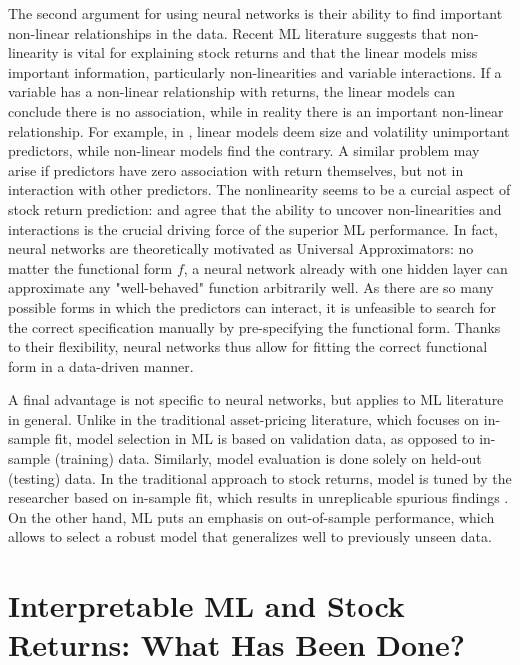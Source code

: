 		 	The second argument for using neural networks is their ability to find important non-linear relationships in the data. Recent ML literature suggests that non-linearity is vital for explaining stock returns \citep{gu2020empirical, bryzgalova2019forest} and that the linear models miss important information, particularly non-linearities and variable interactions. If a variable has a non-linear relationship with returns, the linear models can conclude there is no association, while in reality there is an important non-linear relationship. For example, in \cite{gu2020empirical}, linear models deem size and volatility unimportant predictors, while non-linear models find the contrary. A similar problem may arise if predictors have zero association with return themselves, but not in interaction with other predictors. The nonlinearity seems to be a curcial aspect of stock return prediction: \cite{bryzgalova2019forest} and \cite{gu2020empirical} agree that the ability to uncover non-linearities and interactions is the crucial driving force of the superior ML performance.  	
		 	In fact, neural networks are theoretically motivated as Universal Approximators: no matter the functional form $f$, a neural network already with one hidden layer can approximate any "well-behaved" function arbitrarily well. As there are so many possible forms in which the predictors can interact, it is unfeasible to search for the correct specification manually by pre-specifying the functional form. Thanks to their flexibility, neural networks thus allow for fitting the correct functional form in a data-driven manner.
		 	
		 	A final advantage is not specific to neural networks, but applies to ML literature in general. Unlike in the traditional asset-pricing literature, which focuses on in-sample fit, model selection in ML is based on validation data, as opposed to in-sample (training) data. Similarly, model evaluation is done solely on held-out (testing) data. In the traditional approach to stock returns, model is tuned by the researcher based on in-sample fit, which results in unreplicable spurious findings \citep{mclean2016does}. On the other hand, ML puts an emphasis on out-of-sample performance, which allows to select a robust model that generalizes well to previously unseen data.   
		 		
			
		\section{Interpretable ML and Stock Returns: What Has Been Done?}		
		
